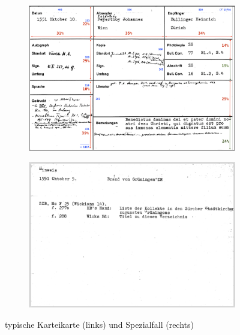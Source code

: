 \begin{figure}[H]
\centering
	\begin{subfigure}[c]{0.47\textwidth}
		\centering
		\includegraphics[scale=0.25]{Bilder/Karteikarte_Beispiel.png}
	\end{subfigure}
	\begin{subfigure}[c]{0.47\textwidth}
		\centering
		\includegraphics[scale=0.38]{Bilder/Exception.png}
	\end{subfigure}
\caption{typische Karteikarte (links) und Spezialfall (rechts)}
\end{figure}

